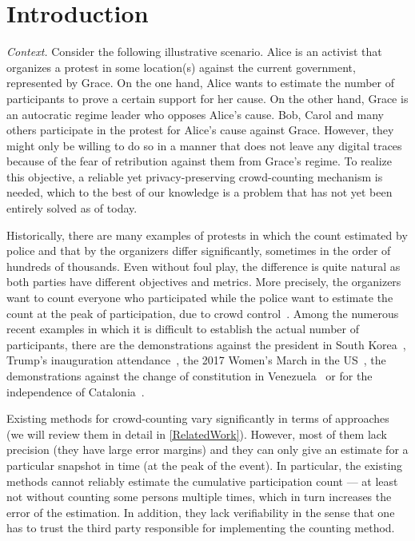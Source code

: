 \section{Introduction}%
\label{Introduction}

\emph{Context.} 
Consider the following illustrative scenario.
Alice is an activist that organizes a protest in some location(s) against the current government, represented by Grace.
On the one hand, Alice wants to estimate the number of participants to prove a certain support for her cause.
On the other hand, Grace is an autocratic regime leader who opposes Alice's cause.
Bob, Carol and many others participate in the protest for Alice's cause against Grace.
However, they might only be willing to do so in a manner that does not leave any digital traces because of the fear of retribution against them from Grace's regime. 
To realize this objective, a reliable yet privacy-preserving crowd-counting mechanism is needed, which to the best of our knowledge is a problem that has not yet been entirely solved as of today.

Historically, there are many examples of protests in which the count estimated by police and that by the organizers differ significantly, sometimes in the order of hundreds of thousands.
Even without foul play, the difference is quite natural as both parties have different objectives and metrics.
More precisely, the organizers want to count everyone who participated while the police want to estimate the count at the peak of participation, due to crowd control~\cite{2016DemonstrationsInSeoul}.
Among the numerous recent examples in which it is difficult to establish the actual number of participants, there are the demonstrations against the president in South Korea~\cite{2016DemonstrationsInSeoul}, Trump's inauguration attendance~\cite{HowWillWeKnowTrumpInauguralCrowdSize}, the 2017 Women's March in the US~\cite{2017WomensMarchesInUS}, the demonstrations against the change of constitution in Venezuela~\cite{AlJazeeraOnVenezuela2017} or for the independence of Catalonia~\cite{CataloniaDemonstrations}.

Existing methods for crowd-counting vary significantly in terms of approaches (we will review them in detail in \cref{RelatedWork}).
However, most of them lack precision (\ie they have large error margins) and they can only give an estimate for a particular snapshot in time (\eg at the peak of the event). 
In particular, the existing methods cannot reliably estimate the cumulative participation count --- at least not without counting some persons multiple times, which in turn increases the error of the estimation.
In addition, they lack verifiability in the sense that one has to trust the third party responsible for implementing the counting method. 

